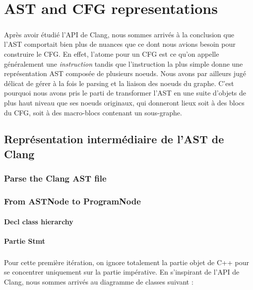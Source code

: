 \documentclass{report}
\begin{document}
\chapter{AST and CFG representations}

\paragraph{}
\hspace{4mm}\textnormal{Apr\`{e}s avoir \'{e}tudi\'{e} l'API de Clang, nous sommes arriv\'{e}s \`{a} la conclusion que l'AST comportait bien plus de nuances que ce dont nous avions besoin
pour construire le CFG. En effet, l'atome pour un CFG est ce qu'on appelle g\'{e}n\'{e}ralement une \textit{instruction} tandis que l'instruction la plus simple
donne une repr\'{e}sentation AST compos\'{e}e de plusieurs noeuds. Nous avons par ailleurs jug\'{e} d\'{e}licat de g\'{e}rer \`{a} la fois le parsing et la liaison des noeuds du graphe.
C'est pourquoi nous avons pris le parti de transformer l'AST en une suite d'objets de plus haut niveau que ses noeuds originaux, qui donneront lieux soit \`{a} des blocs
du CFG, soit \`{a} des macro-blocs contenant un sous-graphe.}

\section{Repr\'{e}sentation interm\'{e}diaire de l'AST de Clang}

\subsection{Parse the Clang AST file}

\subsection{From ASTNode to ProgramNode}

\subsubsection{\textbf{Decl} class hierarchy}

\subsubsection{Partie \textbf{Stmt}}

\paragraph{}
\hspace{4mm}\textnormal{Pour cette premi\`{e}re it\'{e}ration, on ignore totalement la partie objet de C++ pour se concentrer uniquement sur
la partie imp\'{e}rative. En s'inspirant de l'API de Clang, nous sommes arriv\'{e}s au diagramme de classes suivant :}
\end{document}
